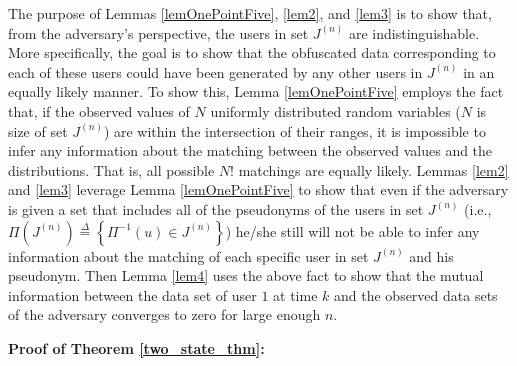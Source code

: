 The purpose of Lemmas \ref{lemOnePointFive}, \ref{lem2}, and \ref{lem3} is to show that, from the adversary's perspective, the users in set $J^{(n)}$ are indistinguishable. More specifically, the goal is to show that the obfuscated data corresponding to each of these users could have been generated by any other users in $J^{(n)}$ in an equally likely manner. To show this, Lemma \ref{lemOnePointFive} employs the fact that, if the observed values of $N$ uniformly distributed random variables ($N$ is size of set $J^{(n)}$) are within the intersection of their ranges, it is impossible to infer any information about the matching between the observed values and the distributions. That is, all possible $N!$ matchings are equally likely. Lemmas \ref{lem2} and \ref{lem3} leverage Lemma \ref{lemOnePointFive} to show that even if the adversary is given a set that includes all of the pseudonyms of the users in set $J^{(n)}$  (i.e., $\Pi(J^{(n)})\overset{\Delta}{=} \left\{\Pi^{-1}(u) \in J^{(n)}\right\}$) he/she still will not be able to infer any information about the matching of each specific user in set $J^{(n)}$ and his pseudonym. Then Lemma \ref{lem4} uses the above fact to show that the mutual information between the data set of user $1$ at time $k$ and the observed data sets of the adversary converges to zero for large enough $n$.


\noindent \textbf{Proof of Theorem \ref{two_state_thm}:}

